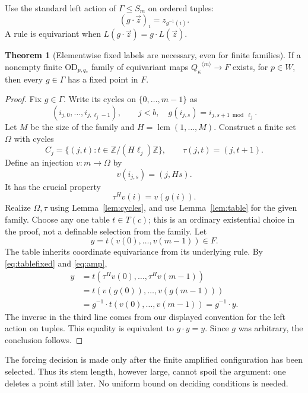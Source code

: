 \documentclass[11pt,letterpaper]{article}
\theoremstyle{definition}
\newtheorem{theorem}[definition]{Theorem}
\numberwithin{equation}{section}
\newcommand{\OD}{\mathrm{OD}}
\newcommand{\lcm}{\operatorname{lcm}}
\newcommand{\ttuple}[2]{{#1}^{\langle #2\rangle}}
\begin{document}
Use the standard left action of $\Gamma\le S_m$ on ordered tuples:
\[
               (g\cdot\vec z)_i=z_{g^{-1}(i)}.
\]
A rule is equivariant when $L(g\cdot\vec z)=g\cdot L(\vec z)$.

\begin{theorem}[Elementwise fixed labels are necessary, even for finite families]
\label{thm:necessity}
If a nonempty finite $\OD_{p,q_*}$ family of equivariant maps
$\ttuple{Q_\kappa}{m}\to F$ exists, for $p\in W$, then every $g\in\Gamma$
has a fixed point in $F$.
\end{theorem}

\begin{proof}
Fix $g\in\Gamma$. Write its cycles on $\{0,\ldots,m-1\}$ as
\[
 (i_{j,0},\ldots,i_{j,\ell_j-1}),\qquad j<b,
 \quad g(i_{j,s})=i_{j,s+1\bmod\ell_j}.
\]
Let $M$ be the size of the family and $H=\lcm(1,\ldots,M)$. Construct a
finite set $\Omega$ with cycles
\[
 C_j=\{(j,t):t\in\mathbb Z/(H\ell_j)\mathbb Z\},
 \qquad\tau(j,t)=(j,t+1).
\]
Define an injection $v:m\to\Omega$ by
\[
                         v(i_{j,s})=(j,Hs).
\]
It has the crucial property
\begin{equation}\label{eq:amp}
                         \tau^H v(i)=v(g(i)).
\end{equation}
Realize $\Omega,\tau$ using Lemma~\ref{lem:cycles}, and use
Lemma~\ref{lem:table} for the given family. Choose any one table $t\in T(c)$;
this is an ordinary existential choice in the proof, not a definable
selection from the family. Let
\[
                           y=t(v(0),\ldots,v(m-1))\in F.
\]
The table inherits coordinate equivariance from its underlying rule. By
\eqref{eq:tablefixed} and \eqref{eq:amp},
\begin{align*}
 y
 &=t(\tau^H v(0),\ldots,\tau^H v(m-1))\\
 &=t(v(g(0)),\ldots,v(g(m-1)))\\
 &=g^{-1}\cdot t(v(0),\ldots,v(m-1))
   =g^{-1}\cdot y.
\end{align*}
The inverse in the third line comes from our displayed convention for the
left action on tuples. This equality is equivalent to $g\cdot y=y$.
Since $g$ was arbitrary, the conclusion follows.
\end{proof}

The forcing decision is made only after the finite amplified configuration
has been selected. Thus its stem length, however large, cannot spoil the
argument: one deletes a point still later. No uniform bound on deciding
conditions is needed.
\end{document}

